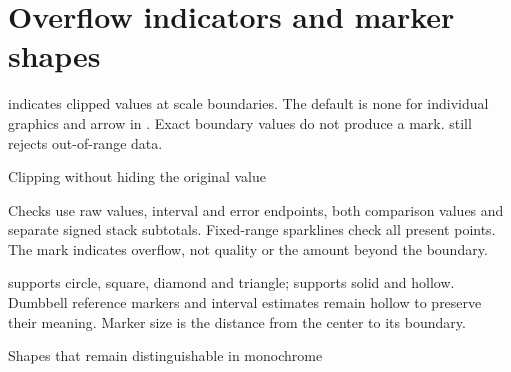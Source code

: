 \section{Overflow indicators and marker shapes}
 indicates clipped values at scale boundaries.
The default is none for individual graphics and arrow in . Exact boundary
values do not produce a mark.  still rejects out-of-range data.
\begin{demo}{Clipping without hiding the original value}

\end{demo}
Checks use raw values, interval and error endpoints, both comparison values and
separate signed stack subtotals. Fixed-range sparklines check all present points.
The mark indicates overflow, not quality or the amount beyond the boundary.

 supports circle, square, diamond and triangle;
 supports solid and hollow. Dumbbell reference markers and
interval estimates remain hollow to preserve their meaning. Marker size is the
distance from the center to its boundary.
\begin{demo}{Shapes that remain distinguishable in monochrome}


\end{demo}
